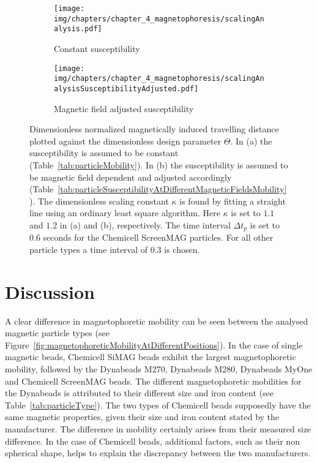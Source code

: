 \begin{figure}
	\centering
	\begin{subfigure}[b]{.7\textwidth}
		\texttt{[image: img/chapters/chapter\_4\_magnetophoresis/scalingAnalysis.pdf]}
		\caption{Constant susceptibility}
		\label{fig:normalizedMagnetophoreticVelocityWithConstantSusceptibility}
	\end{subfigure}
	\begin{subfigure}[b]{.7\textwidth}
		\texttt{[image: img/chapters/chapter\_4\_magnetophoresis/scalingAnalysisSusceptibilityAdjusted.pdf]}
		\caption{Magnetic field adjusted susceptibility}
		\label{fig:normalizedMagnetophoreticVelocityWithVariableSusceptibility}
	\end{subfigure}
\caption[Dimensionless normalized magnetically induced particle travelling distance for a given time interval]{Dimensionless normalized magnetically induced travelling distance plotted against the dimensionless design parameter $\Theta$. In (a) the susceptibility is assumed to be constant (Table~\ref{tab:particleMobility}). In (b) the susceptibility is assumed to be magnetic field dependent and adjusted accordingly (Table~\ref{tab:particleSusceptibilityAtDifferentMagneticFieldsMobility}). The dimensionless scaling constant $\kappa$ is found by fitting a straight line using an ordinary least square algorithm. Here $\kappa$ is set to $1.1$ and $1.2$ in (a) and (b), respectively. The time interval $\Delta t_{p}$ is set to $0.6$ seconds for the Chemicell ScreenMAG particles. For all other particle types a time interval of $0.3$ is chosen.}
\label{fig:normalizedMagnetophoreticVelocity}
\end{figure}
 
 
\section{Discussion}
A clear difference in magnetophoretic mobility can be seen between the analysed magnetic particle types (see Figure~\ref{fig:magnetophoreticMobilityAtDifferentPositions}). In the case of single magnetic beads, Chemicell SiMAG beads exhibit the largest magnetophoretic mobility, followed by the Dynabeads M270, Dynabeads M280, Dynabeads MyOne and Chemicell ScreenMAG beads. The different magnetophoretic mobilities for the Dynabeads is attributed to their different size and iron content (see Table~\ref{tab:particleType}). The two types of Chemicell beads supposedly have the same magnetic properties, given their size and iron content stated by the manufacturer. The difference in mobility certainly arises from their measured size difference. In the case of Chemicell beads, additional factors, such as their non spherical shape, helps to explain the discrepancy between the two manufacturers.

